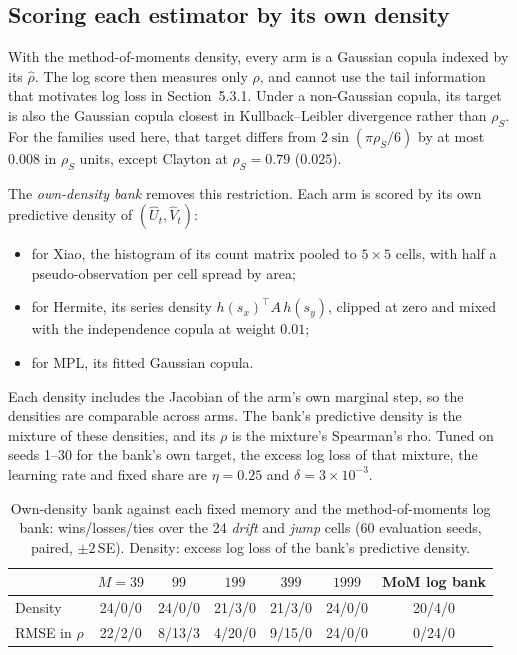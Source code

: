 \subsection{Scoring each estimator by its own density}
\label{sec:own}

With the method-of-moments density, every arm is a Gaussian copula indexed by its $\hat\rho$. The
log score then measures only $\rho$, and cannot use the tail information that motivates log loss
in Section~5.3.1. Under a non-Gaussian copula, its target is also the Gaussian copula closest in
Kullback--Leibler divergence rather than $\rho_S$. For the families used here, that target
differs from $2\sin(\pi\rho_S/6)$ by at most $0.008$ in $\rho_S$ units, except Clayton at
$\rho_S=0.79$ ($0.025$).

The \emph{own-density bank} removes this restriction. Each arm is scored by its own predictive
density of $(\hat U_t,\hat V_t)$:
\begin{itemize}
  \item for Xiao, the histogram of its count matrix pooled to $5\times5$ cells, with half a
    pseudo-observation per cell spread by area;
  \item for Hermite, its series density $h(s_x)^\top A\,h(s_y)$, clipped at zero and mixed with
    the independence copula at weight $0.01$;
  \item for MPL, its fitted Gaussian copula.
\end{itemize}
Each density includes the Jacobian of the arm's own marginal step, so the densities are
comparable across arms. The bank's predictive density is the mixture of these densities, and its
$\rho$ is the mixture's Spearman's rho. Tuned on seeds 1--30 for the bank's own target, the
excess log loss of that mixture, the learning rate and fixed share are $\eta=0.25$ and
$\delta=3\times10^{-3}$.

\begin{table}[ht]
  \centering
  \caption{Own-density bank against each fixed memory and the method-of-moments log bank:
    wins/losses/ties over the 24 \emph{drift} and \emph{jump} cells (60 evaluation seeds, paired,
    $\pm2$\,SE). Density: excess log loss of the bank's predictive density.}
  \label{tab:own}
  \small
  \begin{tabular}{lcccccc}
    \toprule
    & $M=39$ & $99$ & $199$ & $399$ & $1999$ & MoM log bank \\
    \midrule
    Density & 24/0/0 & 24/0/0 & 21/3/0 & 21/3/0 & 24/0/0 & 20/4/0 \\
    RMSE in $\rho$ & 22/2/0 & 8/13/3 & 4/20/0 & 9/15/0 & 24/0/0 & 0/24/0 \\
    \bottomrule
  \end{tabular}
\end{table}

